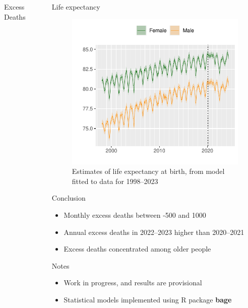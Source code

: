\documentclass[final]{beamer}
\newlength{\sepwid}
\newlength{\onecolwid}
\newlength{\twocolwid}
\begin{document}
\begin{frame}[t]
\begin{columns}[t]
\begin{column}{\twocolwid}
\begin{alertblock}{Excess Deaths}
\end{alertblock} 

\end{column} %

\begin{column}{\sepwid}\end{column} %

\begin{column}{\onecolwid} %

\begin{block}{Life expectancy}
\begin{figure}
\includegraphics[width = 0.95\linewidth]{fig_lifeexp}
\caption{Estimates of life expectancy at birth, from model fitted to data for 1998--2023}
\end{figure}
\end{block}

  
\begin{block}{Conclusion}
  \begin{itemize}
  \item Monthly excess deaths between -500 and 1000
  \item Annual excess deaths in 2022--2023 higher than 2020--2021
  \item Excess deaths concentrated among older people
  \end{itemize}
\end{block}

\begin{block}{Notes}
\begin{itemize}
\item Work in progress, and results are provisional
\item Statistical models implemented using R package \textbf{bage}
\end{itemize}
\end{block}


\end{column}
\end{columns}
\end{frame}
\end{document}

